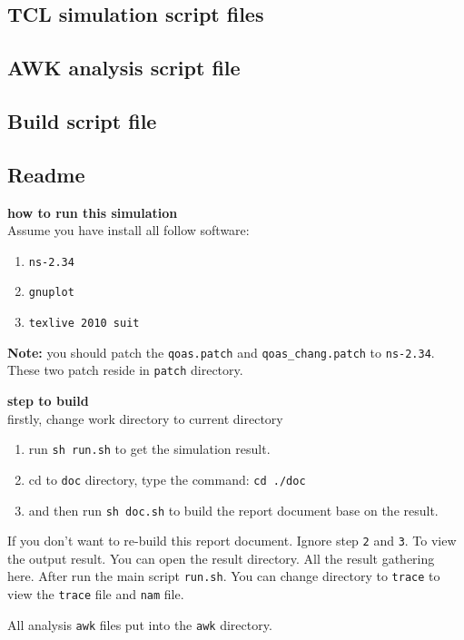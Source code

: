 \subsection{TCL simulation script files}

%
%
%

\newpage
\subsection{AWK analysis script file}


\newpage
\subsection{Build script file}

\subsection{Readme}
{\bf how to run this simulation} \\
Assume you have install all follow software:
\begin{enumerate}
    \item \verb|ns-2.34|
    \item \verb|gnuplot|
    \item \verb|texlive 2010 suit|
\end{enumerate}
{\bf Note:} you should patch the \verb|qoas.patch| and \verb|qoas_chang.patch| to \verb|ns-2.34|. These two patch reside in \verb|patch| directory.

{\bf step to build} \\
firstly, change work directory to current directory

\begin{enumerate}
    \item run \verb|sh run.sh| to get the simulation result.  
    \item cd to \verb|doc| directory, type the command: \verb|cd ./doc|
    \item and then run \verb|sh doc.sh| to build the report document base on the result.
\end{enumerate}

If you don't want to re-build this report document. Ignore step \verb|2| and \verb|3|. To view the output result. You can open the result directory. All the result gathering here. After run the main script \verb|run.sh|. You can change directory to \verb|trace| to view the \verb|trace| file and \verb|nam| file.

All analysis \verb|awk| files put into the \verb|awk| directory.
